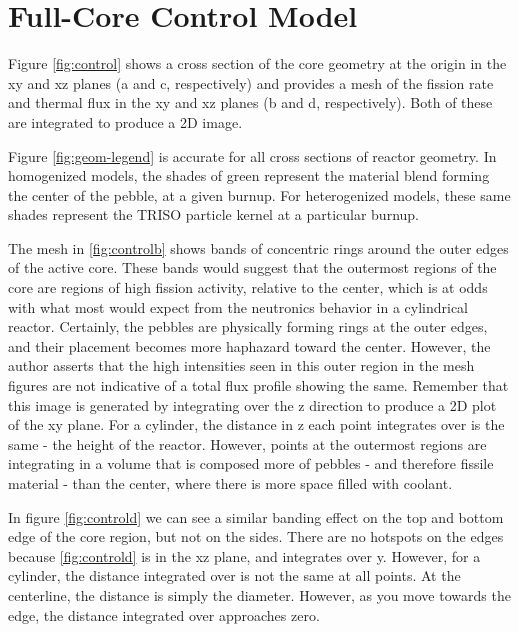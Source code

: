 \section{Full-Core Control Model}

Figure \ref{fig:control} shows a cross section of the core geometry at the origin in the xy and xz planes (a and c, respectively) and provides a mesh of the fission rate and thermal flux in the xy and xz planes (b and d, respectively).  Both of these are integrated to produce a 2D image.


Figure \ref{fig:geom-legend} is accurate for all cross sections of reactor geometry.  In homogenized models, the shades of green represent the material blend forming the center of the pebble, at a given burnup.  For heterogenized models, these same shades represent the TRISO particle kernel at a particular burnup.




The mesh in  \ref{fig:controlb} shows bands of concentric rings around the outer edges of the active core.  These bands would suggest that the outermost regions of the core are regions of high fission activity, relative to the center, which is at odds with what most would expect from the neutronics behavior in a cylindrical reactor.  Certainly, the pebbles are physically forming rings at the outer edges, and their placement becomes more haphazard toward the center.  However, the author asserts that the high intensities seen in this outer region in the mesh figures are not indicative of a total flux profile showing the same.  Remember that this image is generated by integrating over the z direction to produce a 2D plot of the xy plane.  For a cylinder, the distance in z each point integrates over is the same - the height of the reactor.  However, points at the outermost regions are integrating in a volume that is composed more of pebbles - and therefore fissile material - than the center, where there is more space filled with coolant.

In figure \ref{fig:controld}  we can see a similar banding effect on the top and bottom edge of the core region, but not on the sides.  There are no hotspots on the edges because \ref{fig:controld} is in the xz plane, and integrates over y.  However, for a cylinder, the distance integrated over is not the same at all points.  At the centerline, the distance is simply the diameter.  However, as you move towards the edge, the distance integrated over approaches zero.


